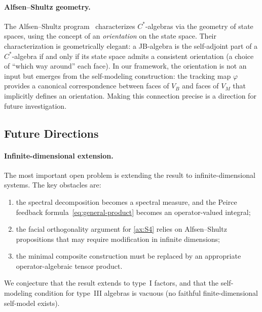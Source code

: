 \paragraph{Alfsen--Shultz geometry.}
The Alfsen--Shultz program~\cite{AlfsenShultz2003} characterizes
$C^{*}$-algebras via the geometry of state spaces, using the concept
of an \emph{orientation} on the state space.  Their characterization
is geometrically elegant: a JB-algebra is the self-adjoint part of a
$C^{*}$-algebra if and only if its state space admits a consistent
orientation (a choice of ``which way around'' each face).  In our
framework, the orientation is not an input but emerges from the
self-modeling construction: the tracking map $\varphi$ provides a
canonical correspondence between faces of $V_{B}$ and faces of $V_{M}$
that implicitly defines an orientation.  Making this connection precise
is a direction for future investigation.


\subsection{Future Directions}\label{subsec:future}

\paragraph{Infinite-dimensional extension.}
The most important open problem is extending the result to
infinite-dimensional systems.  The key obstacles are:
\begin{enumerate}[label=(\roman*)]
  \item the spectral decomposition becomes a spectral measure, and the
    Peirce feedback
    formula~\eqref{eq:general-product} becomes an operator-valued
    integral;
  \item the facial orthogonality argument for \ref{ax:S4} relies on
    Alfsen--Shultz propositions that may require modification in
    infinite dimensions;
  \item the minimal composite construction must be replaced by an
    appropriate operator-algebraic tensor product.
\end{enumerate}
We conjecture that the result extends to type~I factors, and that the
self-modeling condition for type~III algebras is vacuous (no faithful
finite-dimensional self-model exists).


